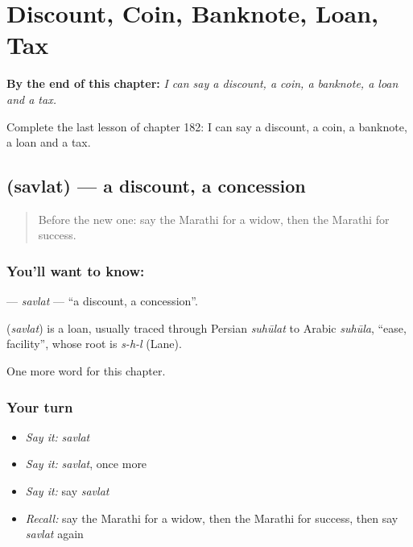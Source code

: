 
\chapter{Discount, Coin, Banknote, Loan, Tax}
\label{ch:mr-discount-coin-banknote-loan-tax}

\begin{chapteropening}
\textbf{By the end of this chapter:} \emph{I can say a discount, a coin, a banknote, a loan and a tax.}

Complete the last lesson of chapter 182: I can say a discount, a coin, a banknote, a loan and a tax.
\end{chapteropening}

\section[\texorpdfstring{\mr{सवलत} (savlat)}{सवलत (savlat)}]{ (savlat) — a discount, a concession}

\label{lesson:MR-C182-savlat}



\begin{quote}
Before the new one: say the Marathi for a widow, then the Marathi for success.
\end{quote}

\subsection*{You'll want to know: }
\textbf{} — \emph{savlat} — \textquotedblleft{}a discount, a concession\textquotedblright{}.

\begin{cousinweb}
\textbf{} (\emph{savlat}) is a loan, usually traced through Persian \emph{suhūlat} to Arabic \emph{suhūla}, \textquotedblleft{}ease, facility\textquotedblright{}, whose root is \emph{s-h-l} (Lane).
\end{cousinweb}

\begin{grammarlens}[title={What you've built}]
One more word for this chapter.
\end{grammarlens}

\subsection*{Your turn}
\begin{itemize}
\raggedright
  \item \emph{Say it:} \emph{savlat}
  \item \emph{Say it:} \emph{savlat}, once more
  \item \emph{Say it:} say \emph{savlat}
  \item \emph{Recall:} say the Marathi for a widow, then the Marathi for success, then say \emph{savlat} again
\end{itemize}

